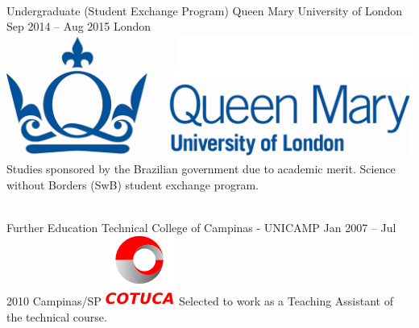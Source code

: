\documentclass[
	a4paper,
]{fortysecondscv}
\newcommand{\profiledivider}{\textcolor{body!30}{\hdashrule{\linewidth}{0.6pt}{0.5ex}}\\}
\begin{document}
    \profiledivider
    \cvevent
        {Undergraduate (Student Exchange Program)}
        {Queen Mary University of London}
        {Sep 2014 -- Aug 2015}
        {London}
        {\hspace{2mm}\includegraphics[height=0.07\textwidth]{QMUL}}
        {Studies sponsored by the Brazilian government due to academic merit. Science without Borders (SwB) student exchange program.}

    \profiledivider
	\cvevent
        {Further Education}
        {Technical College of Campinas - UNICAMP}
        {Jan 2007 -- Jul 2010}
        {Campinas/SP}
        {\hspace{2mm}\includegraphics[height=0.07\textwidth]{Cotuca}}
        {Selected to work as a Teaching Assistant of the technical course.}
\end{document}
